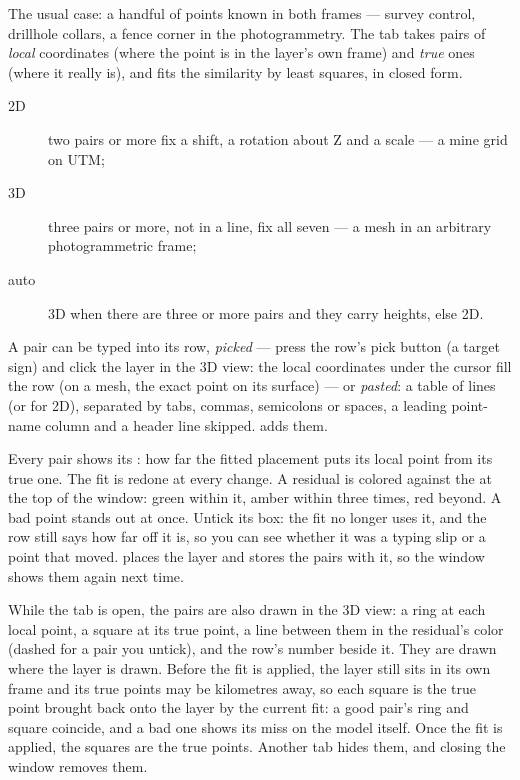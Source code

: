 The usual case: a handful of points known in both frames — survey control, drillhole collars, a fence
corner in the photogrammetry. The  tab takes pairs of \emph{local} coordinates (where
the point is in the layer's own frame) and \emph{true} ones (where it really is), and fits the similarity
by least squares, in closed form.

\begin{description}
\item[2D] two pairs or more fix a shift, a rotation about Z and a scale — a mine grid on UTM;
\item[3D] three pairs or more, not in a line, fix all seven — a mesh in an arbitrary photogrammetric
  frame;
\item[auto] 3D when there are three or more pairs and they carry heights, else 2D.
\end{description}

A pair can be typed into its row, \emph{picked} — press the row's pick button (a target sign) and click the layer in the 3D
view: the local coordinates under the cursor fill the row (on a mesh, the exact point on its surface) —
or \emph{pasted}: a table of lines  (or  for 2D), separated by tabs,
commas, semicolons or spaces, a leading point-name column and a header line skipped. 
adds them.

Every pair shows its : how far the fitted placement puts its local point from its true
one. The fit is redone at every change. A residual is colored against the  at the top of the
window: green within it, amber within three times, red beyond. A bad point stands out at once. Untick its
 box: the fit no longer uses it, and the row still says how far off it is, so you can see whether
it was a typing slip or a point that moved.  places the layer and stores the pairs with it,
so the window shows them again next time.

While the  tab is open, the pairs are also drawn in the 3D view: a ring at each local
point, a square at its true point, a line between them in the residual's color (dashed for a pair you
untick), and the row's number beside it. They are drawn where the layer is drawn. Before the fit is
applied, the layer still sits in its own frame and its true points may be kilometres away, so each
square is the true point brought back onto the layer by the current fit: a good pair's ring and square
coincide, and a bad one shows its miss on the model itself. Once the fit is applied, the squares are
the true points. Another tab hides them, and closing the window removes them.

